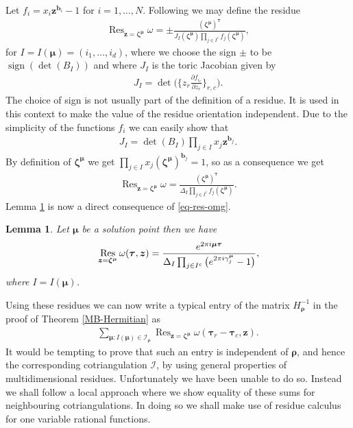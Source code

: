 \documentclass[11pt]{article}
\numberwithin{equation}{section}
\DeclareMathOperator*{\Res}{Res}
\DeclareMathOperator*{\sign}{sign}
\numberwithin{equation}{section}
\newtheorem{Lemma}[Theorem]{Lemma}
\begin{document}
Let $f_i = x_i\bm{z}^{\bm{b}_i} - 1$ for $i=1,\dots,N$. Following \cite[p.~650]{GH78} we may define the residue
\begin{gather*}
\Res_{\bm{z} = \bm{\zeta}^{\bm\mu}} \omega = \pm \frac{(\bm{\zeta}^{\bm\mu})^{\bm{\tau}}}{J_{I}(\bm{\zeta}^{\bm\mu})\prod_{j \in I^c} f_j(\bm{\zeta}^{\bm\mu}) },
\end{gather*}
for $I = I(\bm{\mu}) = (i_1,\dots,i_d)$, where we choose the sign $\pm$ to be $\sign(\det(B_I))$
and where $J_I$ is the toric Jacobian given by
\begin{gather*}
J_I = \det\bigg(\bigg\{z_r \frac{\partial f_{i_c}}{\partial z_r}\bigg\}_{r,c}\bigg).
\end{gather*}
The choice of sign is not usually part of the definition of a residue. It is used in this context to make the value of the residue orientation independent.
Due to the simplicity of the functions $f_i$ we can easily show that
\begin{gather*}
J_I = \det(B_I) \prod_{j \in I}x_j\bm{z}^{\bm{b}_{j}}.
\end{gather*}
By definition of $\bm{\zeta}^{\bm\mu}$ we get $\prod_{j \in I}x_j(\bm{\zeta}^{\bm\mu})^{\bm{b}_{j}} = 1$, so as a consequence we get
\begin{gather}
\Res_{\bm{z} = \bm{\zeta}^{\bm\mu}} \omega =
\frac{(\bm{\zeta}^{\bm\mu})^{\bm{\tau}}}{\Delta_I
\prod_{j \in I^c} f_j(\bm{\zeta}^{\bm\mu})}.
\label{eq-res-omg}
\end{gather}
\noindent Lemma \ref{eval-res-complete} is now a direct consequence of \eqref{eq-res-omg}.

\begin{Lemma}\label{eval-res-complete}
Let $\bm\mu$ be a solution point then we have
\begin{gather*}
\Res_{\bm{z} = \bm{\zeta}^{\bm\mu}} \omega(\bm\tau,\bm{z}) = \frac{{\rm e}^{2 \pi {\rm i} \bm{\mu} \bm\tau}}{\Delta_I\prod_{j \in I^c}\big({\rm e}^{2 \pi {\rm i} \gamma^{\bm\mu}_j} - 1\big)},
\end{gather*}
where $I = I(\bm\mu)$.
\end{Lemma}


Using these residues we can now write a typical entry of the matrix
$H_{\bm\rho}^{-1}$ in the proof of Theorem \ref{MB-Hermitian} as
\begin{gather*}
\sum_{\bm\mu\colon I(\bm\mu)\in\mathcal{I}_{\bm\rho}}\Res_{\bm{z}=\bm{\zeta}^{\bm\mu}}
\omega(\bm{\tau}_r-\bm{\tau}_c,\bm{z}).
\end{gather*}
It would be tempting to prove that such an entry is independent of $\bm\rho$,
and hence the correspon\-ding cotriangulation $\mathcal{I}$, by
using general properties of multidimensional residues. Unfortunately we have
been unable to do so.
Instead we shall follow a local approach where we show equality of these sums
for neighbouring cotriangulations. In doing so we shall make use of residue
calculus for one variable rational functions.
\end{document}
